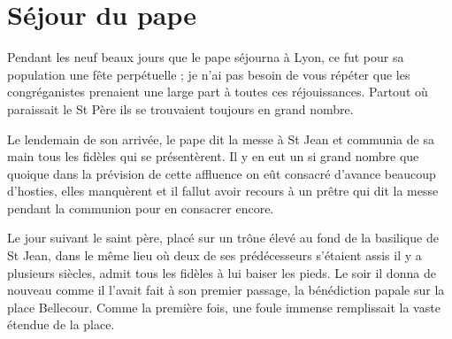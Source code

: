 \section*{Séjour du pape}
Pendant les neuf beaux jours que le pape séjourna à Lyon, ce fut pour sa population une fête perpétuelle ; je n'ai pas besoin de vous répéter que les congréganistes prenaient une large part à toutes ces réjouissances. Partout où paraissait le St Père ils se trouvaient toujours en grand nombre.

Le lendemain de son arrivée, le pape dit la messe à St Jean et communia de sa main tous les fidèles qui se présentèrent. Il y en eut un si grand nombre que quoique dans la prévision de cette affluence on eût consacré d'avance beaucoup d'hosties, elles manquèrent et il fallut avoir recours à un prêtre qui dit la
messe pendant la communion pour en consacrer encore.

Le jour suivant le saint père, placé sur un trône élevé au fond de la basilique de St Jean, dans le même lieu où deux de ses prédécesseurs s'étaient assis il y a plusieurs siècles, admit tous les fidèles à lui baiser les pieds. Le soir il donna de nouveau comme il l'avait fait à son premier passage, la bénédiction papale sur la place Bellecour. Comme la première fois, une foule immense remplissait la vaste étendue de la place.

